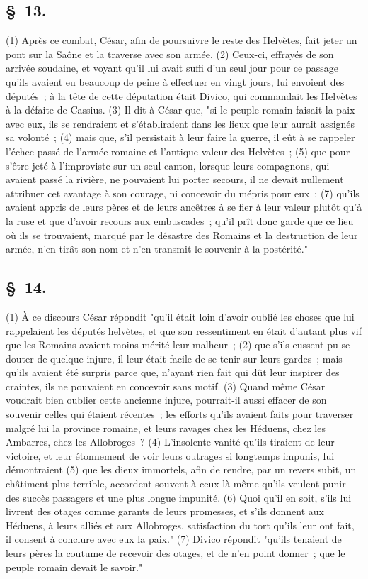 \documentclass[french,twoside]{book} %
\begin{document}
\subsection[{§ 13.}]{ \textsc{§ 13.} }
\noindent (1) Après ce combat, César, afin de poursuivre le reste des Helvètes, fait jeter un pont sur la Saône et la traverse avec son armée. (2) Ceux-ci, effrayés de son arrivée soudaine, et voyant qu’il lui avait suffi d’un seul jour pour ce passage qu’ils avaient eu beaucoup de peine à effectuer en vingt jours, lui envoient des députés ; à la tête de cette députation était Divico, qui commandait les Helvètes à la défaite de Cassius. (3) Il dit à César que, "si le peuple romain faisait la paix avec eux, ils se rendraient et s’établiraient dans les lieux que leur aurait assignés sa volonté ; (4) mais que, s’il persistait à leur faire la guerre, il eût à se rappeler l’échec passé de l’armée romaine et l’antique valeur des Helvètes ; (5) que pour s’être jeté à l’improviste sur un seul canton, lorsque leurs compagnons, qui avaient passé la rivière, ne pouvaient lui porter secours, il ne devait nullement attribuer cet avantage à son courage, ni concevoir du mépris pour eux ; (7) qu’ils avaient appris de leurs pères et de leurs ancêtres à se fier à leur valeur plutôt qu’à la ruse et que d’avoir recours aux embuscades ; qu’il prît donc garde que ce lieu où ils se trouvaient, marqué par le désastre des Romains et la destruction de leur armée, n’en tirât son nom et n’en transmit le souvenir à la postérité."
\subsection[{§ 14.}]{ \textsc{§ 14.} }
\noindent (1) À ce discours César répondit "qu’il était loin d’avoir oublié les choses que lui rappelaient les députés helvètes, et que son ressentiment en était d’autant plus vif que les Romains avaient moins mérité leur malheur ; (2) que s’ils eussent pu se douter de quelque injure, il leur était facile de se tenir sur leurs gardes ; mais qu’ils avaient été surpris parce que, n’ayant rien fait qui dût leur inspirer des craintes, ils ne pouvaient en concevoir sans motif. (3) Quand même César voudrait bien oublier cette ancienne injure, pourrait-il aussi effacer de son souvenir celles qui étaient récentes ; les efforts qu’ils avaient faits pour traverser malgré lui la province romaine, et leurs ravages chez les Héduens, chez les Ambarres, chez les Allobroges ? (4) L'insolente vanité qu’ils tiraient de leur victoire, et leur étonnement de voir leurs outrages si longtemps impunis, lui démontraient (5) que les dieux immortels, afin de rendre, par un revers subit, un châtiment plus terrible, accordent souvent à ceux-là même qu’ils veulent punir des succès passagers et une plus longue impunité. (6) Quoi qu’il en soit, s’ils lui livrent des otages comme garants de leurs promesses, et s’ils donnent aux Héduens, à leurs alliés et aux Allobroges, satisfaction du tort qu’ils leur ont fait, il consent à conclure avec eux la paix." (7) Divico répondit "qu’ils tenaient de leurs pères la coutume de recevoir des otages, et de n’en point donner ; que le peuple romain devait le savoir."
\end{document}

